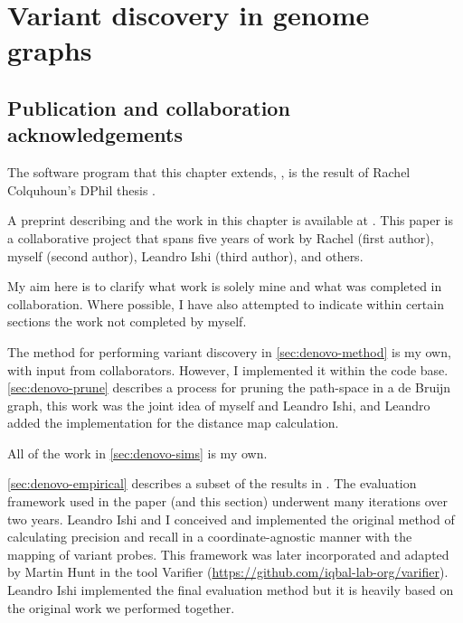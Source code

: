 
\chapter{Variant discovery in genome graphs}
\label{chap:denovo}
\ifpdf
    \graphicspath{{Chapter1/Figs/Raster/}{Chapter1/Figs/PDF/}{Chapter1/Figs/}}
\else
    \graphicspath{{Chapter1/Figs/Vector/}{Chapter1/Figs/}}
\fi
\setcounter{section}{-1}
\section{Publication and collaboration acknowledgements}
\label{sec:denovo-acknowledge}

The software program that this chapter extends, \pandora{}, is the result of Rachel Colquhoun's DPhil thesis \cite{rachelthesis}.

A preprint describing \pandora{} and the work in this chapter is available at \cite{pandora}. This paper is a collaborative project that spans five years of work by Rachel (first author), myself (second author), Leandro Ishi (third author), and others.

My aim here is to clarify what work is solely mine and what was completed in collaboration. Where possible, I have also attempted to indicate within certain sections the work not completed by myself.

The method for performing \denovo{} variant discovery in \autoref{sec:denovo-method} is my own, with input from collaborators. However, I implemented it within the \pandora{} code base. \autoref{sec:denovo-prune} describes a process for pruning the path-space in a de Bruijn graph, this work was the joint idea of myself and Leandro Ishi, and Leandro added the implementation for the distance map calculation.

All of the work in \autoref{sec:denovo-sims} is my own.

\autoref{sec:denovo-empirical} describes a subset of the results in \cite{pandora}. The evaluation framework used in the paper (and this section) underwent many iterations over two years. Leandro Ishi and I conceived and implemented the original method of calculating precision and recall in a coordinate-agnostic manner with the mapping of variant probes. This framework was later incorporated and adapted by Martin Hunt in the tool Varifier (\url{https://github.com/iqbal-lab-org/varifier}). Leandro Ishi implemented the final evaluation method but it is heavily based on the original work we performed together.

